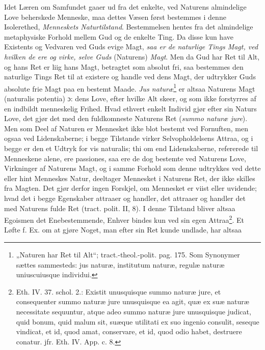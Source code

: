 \documentclass[12pt,a4paper]{book}
\newcommand{\opage}[1]{\marginnote{\footnotesize\textit{[#1]}}}
\begin{document}
Idet Læren om Samfundet gaaer ud fra det enkelte, ved Naturens almindelige Love beherskede Menneske, maa dettes Væsen først bestemmes i denne Isolerethed, \emph{Menneskets Naturtilstand}. Bestemmelsen hentes fra det almindelige metaphysiske Forhold mellem Gud og de enkelte
\opage{134} \setcounter{footnote}{0}%
Ting. Da disse kun have Existents og Vedvaren ved Guds evige Magt, \emph{saa er de naturlige Tings Magt, ved hvilken de ere og virke, selve Guds} (Naturens) \emph{Magt}. Men da Gud har Ret til Alt, og hans Ret er liig hans Magt, betragtet som absolut fri, saa bestemmes den naturlige Tings Ret til at existere og handle ved dens Magt, der udtrykker Guds absolute frie Magt paa en bestemt Maade. \emph{Jus naturæ}\footnote{„Naturen har Ret til Alt“; tract.-theol.-polit. pag. 175. Som Synonymer sættes sammesteds: jus naturæ, institutum naturæ, regulæ naturæ uniuscuiusque individui.} er altsaa Naturens Magt (naturalis potentia) ɔ: dens Love, efter hvilke Alt skeer, og som ikke forstyrres af en indbildt menneskelig Frihed. Hvad ethvert enkelt Individ gjør efter sin Naturs Love, det gjør det med den fuldkomneste Naturens Ret (\emph{summo naturæ jure}). Men som Deel af Naturen er Mennesket ikke blot bestemt ved Fornuften, men ogsaa ved Lidenskaberne; i begge Tilstande virker Selvopholdelsens Attraa, og i begge er den et Udtryk for vis naturalis; thi om end Lidenskaberne, refererede til Menneskene alene, ere passiones, saa ere de dog bestemte ved Naturens Love, Virkninger af Naturens Magt, og i samme Forhold som denne udtrykkes ved dette eller hint Menneskes Natur, deeltager Mennesket i Naturens Ret, der ikke skilles fra Magten. Det gjør derfor ingen Forskjel, om Mennesket er viist eller uvidende; hvad det i begge Egenskaber attraaer og handler, det attraaer og handler det med Naturens fulde Ret (tract. polit. II, 8). I denne Tilstand bliver altsaa Egoismen det Enebestemmende, Enhver bindes kun ved sin egen Attraa\footnote{Eth. IV. 37. schol. 2.: Existit unusquisque summo naturæ jure, et consequenter summo naturæ jure unusquisque ea agit, quæ ex suæ naturæ necessitate sequuntur, atque adeo summo naturæ jure unusquisque judicat, quid bonum, quid malum sit, suæque utilitati ex suo ingenio consulit, seseque vindicat, et id, quod amat, conservare, et id, quod odio habet, destruere conatur. jfr. Eth. IV. App. c. 8.}. Et Løfte f. Ex. om at gjøre Noget, man efter sin Ret kunde undlade, har altsaa
\end{document}

